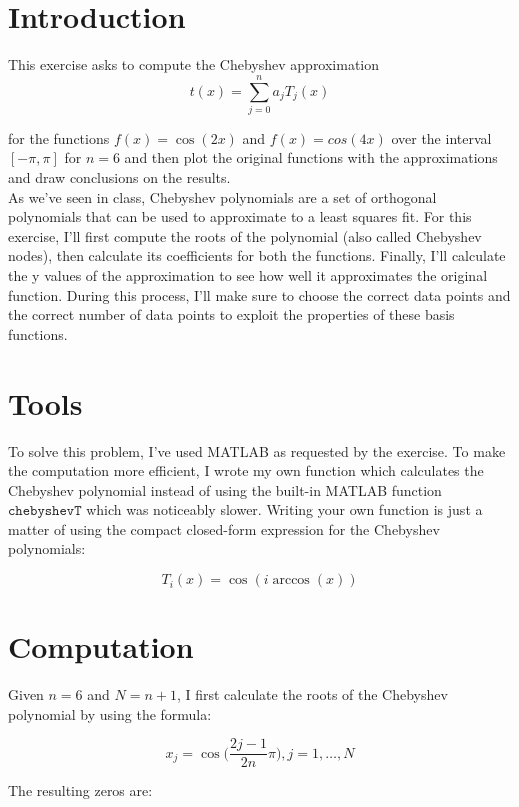 \documentclass{article}
\newcommand{\code}{\texttt}
\begin{document}
\section{Introduction}\label{sec:intro}
This exercise asks to compute the Chebyshev approximation
$$t(x)=\sum^n_{j=0}{a_jT_j(x)}$$

for the functions $f(x)=\cos(2x)$ and $f(x)=cos(4x)$ over the interval $[-\pi,\pi]$ for $n = 6$ and then plot the original functions with the approximations and draw conclusions on the results.\\

As we've seen in class, Chebyshev polynomials are a set of orthogonal polynomials that can be used to approximate to a least squares fit. For this exercise, I'll first compute the roots of the polynomial (also called Chebyshev nodes), then calculate its coefficients for both the functions. Finally, I'll calculate the y values of the approximation to see how well it approximates the original function. During this process, I'll make sure to choose the correct data points and the correct number of data points to exploit the properties of these basis functions.

\section{Tools}
To solve this problem, I've used MATLAB as requested by the exercise. To make the computation more efficient, I wrote my own function which calculates the Chebyshev polynomial instead of using the built-in MATLAB function $\code{chebyshevT}$ which was noticeably slower. Writing your own function is just a matter of using the compact closed-form expression for the Chebyshev polynomials:

$$T_i(x)=\cos{(i\arccos(x))}$$ 

\section{Computation}
Given $n=6$ and $N=n+1$, I first calculate the roots of the Chebyshev polynomial by using the formula:

$$x_j=\cos \Big( \frac{2j-1}{2n}\pi \Big), j=1,\dots,N$$

The resulting zeros are:
\end{document}
